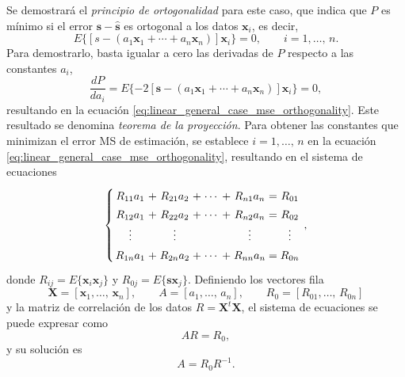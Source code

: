 \documentclass[a4paper]{report}
\newcommand{\X}{\mathbf{X}}
\newcommand{\x}{\mathbf{x}}
\newcommand{\s}{\mathbf{s}}
\begin{document}
Se demostrará el \emph{principio de ortogonalidad} para este caso, que indica que \(P\) es mínimo si el error \(\s-\hat{\s}\) es ortogonal a los datos \(\x_i\), es decir,
\begin{equation}\label{eq:linear_general_case_mse_orthogonality}
  E\{[s-(a_1\x_1+\cdots+a_n\x_n)]\x_i\}=0,\qquad i=1,\dots,\,n.
\end{equation}
Para demostrarlo, basta igualar a cero las derivadas de \(P\) respecto a las constantes \(a_i\),
\[
 \frac{dP}{da_i}=E\{-2[\s-(a_1\x_1+\cdots+a_n\x_n)]\x_i\}=0,
\]
resultando en la ecuación \ref{eq:linear_general_case_mse_orthogonality}. Este resultado se denomina \emph{teorema de la proyección}. Para obtener las constantes que minimizan el error MS de estimación, se establece \(i=1,\dots,\,n\) en la ecuación \ref{eq:linear_general_case_mse_orthogonality}, resultando en el sistema de ecuaciones
\begin{equation}\label{eq:linear_general_case_mse_coeficients_system}
 \arraycolsep=1.4pt\def\arraystretch{1.4}
 \left\{\begin{array}{ccccccccc}
   R_{11}a_1&+&R_{21}a_2&+&\cdots&+&R_{n1}a_n&=&R_{01}\\
   R_{12}a_1&+&R_{22}a_2&+&\cdots&+&R_{n2}a_n&=&R_{02}\\
   \vdots   & &\vdots   & &      & &\vdots   & &\vdots\\
   R_{1n}a_1&+&R_{2n}a_2&+&\cdots&+&R_{nn}a_n&=&R_{0n}\\
 \end{array}\right.,
\end{equation}
donde \(R_{ij}=E\{\x_i\x_j\}\) y \(R_{0j}=E\{\s\x_j\}\). Definiendo los vectores fila
\[
 \X=[\x_1,\dots,\,\x_n],\qquad A=[a_1,\dots,\,a_n],\qquad R_0=[R_{01},\dots,\,R_{0n}]
\]
y la matriz de correlación de los datos \(R=\X^t\X\), el sistema de ecuaciones se puede expresar como
\[
 AR=R_0,
\]
y su solución es
\begin{equation}\label{eq:linear_general_case_mse_coeficients}
 A=R_0R^{-1}.
\end{equation}
\end{document}
